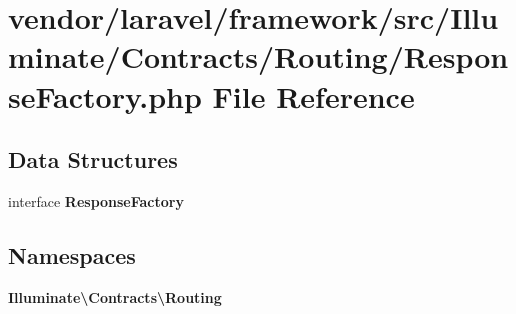 \section{vendor/laravel/framework/src/\+Illuminate/\+Contracts/\+Routing/\+Response\+Factory.php File Reference}
\label{_contracts_2_routing_2_response_factory_8php}
\subsection*{Data Structures}
\begin{DoxyCompactItemize}
\item 
interface {\bf Response\+Factory}
\end{DoxyCompactItemize}
\subsection*{Namespaces}
\begin{DoxyCompactItemize}
\item 
 {\bf Illuminate\textbackslash{}\+Contracts\textbackslash{}\+Routing}
\end{DoxyCompactItemize}
